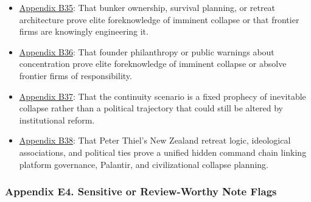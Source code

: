 \documentclass[
  american,
  11pt,
  letterpaper,
]{article}
\providecommand{\tightlist}{%
  \setlength{\itemsep}{0pt}\setlength{\parskip}{0pt}}
\begin{document}
\begin{itemize}
\tightlist
\item
  \hyperref[ch-09-appendix-b35-bunker-ownership-survival-planning-or-retreat-architecture-prove-elite-foreknow]{Appendix
  B35}: That bunker ownership, survival planning, or retreat
  architecture prove elite foreknowledge of imminent collapse or that
  frontier firms are knowingly engineering it.
\item
  \hyperref[ch-09-appendix-b36-founder-philanthropy-or-public-warnings-about-concentration-prove-elite-foreknowl]{Appendix
  B36}: That founder philanthropy or public warnings about concentration
  prove elite foreknowledge of imminent collapse or absolve frontier
  firms of responsibility.
\item
  \hyperref[ch-09-appendix-b37-the-continuity-scenario-is-a-fixed-prophecy-of-inevitable-collapse-rather-than-a]{Appendix
  B37}: That the continuity scenario is a fixed prophecy of inevitable
  collapse rather than a political trajectory that could still be
  altered by institutional reform.
\item
  \hyperref[ch-09-appendix-b38-peter-thiel-s-new-zealand-retreat-logic-ideological-associations-and-political]{Appendix
  B38}: That Peter Thiel's New Zealand retreat logic, ideological
  associations, and political ties prove a unified hidden command chain
  linking platform governance, Palantir, and civilizational collapse
  planning.
\end{itemize}

\subsubsection{Appendix E4. Sensitive or Review-Worthy Note
Flags}\label{ch-09-appendix-e4-sensitive-or-review-worthy-note-flags}
\end{document}
